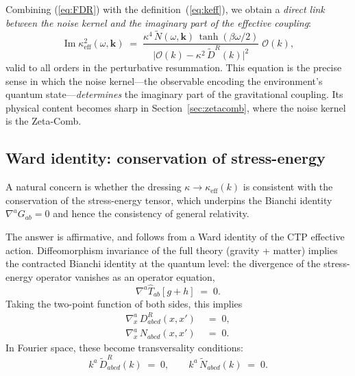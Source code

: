 \documentclass[12pt,a4paper]{article}
\begin{document}
Combining (\ref{eq:FDR}) with the definition~(\ref{eq:keff}), we obtain a \emph{direct link between the noise kernel and the imaginary part of the effective coupling}:
\begin{equation}\label{eq:ImkeffN}
  \operatorname{Im}\kappa_{\mathrm{eff}}^{2}(\omega,\mathbf{k})
  \;=\;
  \frac{\kappa^{4}\,\tilde{N}(\omega,\mathbf{k})\,\tanh(\beta\omega/2)}
       {\bigl|\mathcal{O}(k)-\kappa^{2}\,\tilde{D}^{R}(k)\bigr|^{2}}\;\mathcal{O}(k),
\end{equation}
valid to all orders in the perturbative resummation.
This equation is the precise sense in which the noise kernel---the observable encoding the environment's quantum state---\emph{determines} the imaginary part of the gravitational coupling.
Its physical content becomes sharp in Section~\ref{sec:zetacomb}, where the noise kernel is the Zeta-Comb.

\subsection{Ward identity: conservation of stress-energy}\label{sec:Ward}

A natural concern is whether the dressing $\kappa\to\kappa_{\mathrm{eff}}(k)$ is consistent with the conservation of the stress-energy tensor, which underpins the Bianchi identity $\nabla^{a}G_{ab}=0$ and hence the consistency of general relativity.

The answer is affirmative, and follows from a Ward identity of the CTP effective action.
Diffeomorphism invariance of the full theory (gravity + matter) implies the contracted Bianchi identity at the quantum level: the divergence of the stress-energy operator vanishes as an operator equation,
\begin{equation}\label{eq:Tcons}
  \nabla^{a}\hat{T}_{ab}[g+h] \;=\; 0.
\end{equation}
Taking the two-point function of both sides, this implies
\begin{align}
  \nabla^{a}_{x}\,D^{R}_{abcd}(x,x') &\;=\; 0, \label{eq:divDR}\\[4pt]
  \nabla^{a}_{x}\,N_{abcd}(x,x') &\;=\; 0. \label{eq:divN}
\end{align}
In Fourier space, these become transversality conditions:
\begin{equation}\label{eq:transverse}
  k^{a}\,\tilde{D}^{R}_{abcd}(k) \;=\; 0, \qquad
  k^{a}\,\tilde{N}_{abcd}(k) \;=\; 0.
\end{equation}
\end{document}
